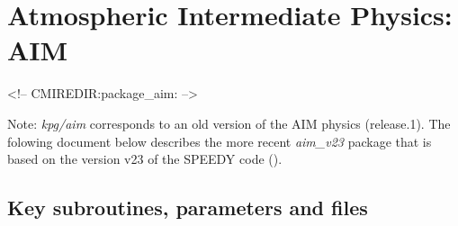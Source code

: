 \section{Atmospheric Intermediate Physics: AIM}
\label{sec:pkg:aim}
\begin{rawhtml}
<!-- CMIREDIR:package_aim: -->
\end{rawhtml}

Note:
 {\it kpg/aim} corresponds to an old version of the AIM physics (release.1).
 The folowing document below describes the more recent {\it aim\_v23} package
 that is based on the version v23 of the SPEEDY code (\cite{molteni:03}).

\subsection{Key subroutines, parameters and files}
\label{sec:pkg:aim:implementation}
